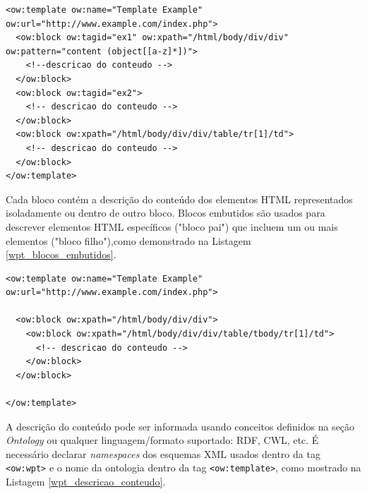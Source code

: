 \pagebreak
{}
\begin{lstlisting}[label=wpt_exemplo_template_tres_blocos]
<ow:template ow:name="Template Example" ow:url="http://www.example.com/index.php">
  <ow:block ow:tagid="ex1" ow:xpath="/html/body/div/div" ow:pattern="content (object[[a-z]*])">
    <!--descricao do conteudo -->
  </ow:block>
  <ow:block ow:tagid="ex2">
    <!-- descricao do conteudo -->
  </ow:block>
  <ow:block ow:xpath="/html/body/div/div/table/tr[1]/td">
    <!-- descricao do conteudo -->
  </ow:block>
</ow:template>
\end{lstlisting}

Cada bloco contém a descrição do conteúdo dos elementos HTML representados isoladamente ou dentro de outro bloco. Blocos embutidos são usados para descrever elementos HTML específicos ("bloco pai") que incluem um ou mais elementos ("bloco filho"),como demonstrado na Listagem \ref{wpt_blocos_embutidos}.

\begin{lstlisting}[label=wpt_blocos_embutidos]
<ow:template ow:name="Template Example" ow:url="http://www.example.com/index.php">

  <ow:block ow:xpath="/html/body/div/div">
    <ow:block ow:xpath="/html/body/div/div/table/tbody/tr[1]/td">
      <!-- descricao do conteudo -->
    </ow:block>
  </ow:block>
  
</ow:template>
\end{lstlisting}

A descrição do conteúdo pode ser informada usando conceitos definidos na seção \emph{Ontology} ou qualquer linguagem/formato suportado: RDF, CWL, etc. É necessário declarar \textit{namespaces} dos esquemas XML usados dentro da tag \texttt{<ow:wpt>} e o nome da ontologia dentro da tag \texttt{<ow:template>}, como mostrado na Listagem \ref{wpt_descricao_conteudo}.

